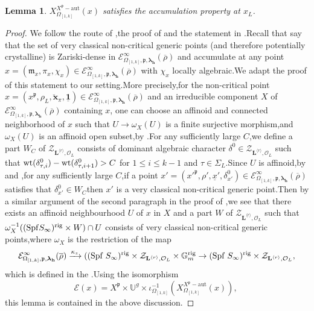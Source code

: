 \documentclass[SecEq,CM,GP]{degruyter-crelle} %
\theoremstyle{plain}
\newtheorem{lem}[thm]{Lemma}
\newcommand{\bersteineigenvarpik}{{\mathcal{E}_{\omepik,\fp,\bm{\lambda}_\bh}^\infty(\overline{\rho})}}
\newcommand{\lrr}{{\langle r\rangle}}
\newcommand{\omepik}{\Omega_{[1,k]}}
\newcommand{\rig}{{\rm rig}}
\newcommand{\rigch}{{\mathcal{Z}_{\bL^{\lrr},\mathcal{O}_L}}}
\newcommand{\Spf}{{\mathrm{Spf}}}
\newcommand{\spf}{{\mathrm{Spf}}}
\newcommand{\wt}{{\rm wt}}
\newcommand{\xfpx}{X^{X^\fp-\mathrm{aut}}_{\omepik}(x)}
\newcommand{\BG}{{\mathbb{G}}}
\newcommand{\BU}{{\mathbb{U}}}
\newcommand{\bL}{{\mathbf{L}}}
\newcommand{\bh}{{\mathbf{h}}}
\newcommand{\cE}{\mathcal E}
\newcommand{\fm}{{\mathfrak{m}}}
\newcommand{\fp}{{\mathfrak{p}}}
\begin{document}
\begin{lem}\label{accumulation} $\xfpx$ satisfies the accumulation property at $x_L$.
\end{lem}
\begin{proof}We follow the route of \cite[Proposition 3.10]{breuil2017smoothness},\;the proof of \cite[Theorem 3.9]{breuil2017interpretation} and the statement in \cite[Theorem 3.3.5]{Ding2021}.\;Recall that \cite[Theorem 3.3.5]{Ding2021} say that the set of very classical non-critical generic points (and therefore potentially crystalline) is Zariski-dense in $\bersteineigenvarpik$ and accumulate at any point $x=(\fm_x, \pi_{x},\chi_x)\in \bersteineigenvarpik$  with $\chi_x$ locally algebraic.\;We adapt the proof of this statement to our setting.\;More precisely,\;for the non-critical point $x=(x^{\fp}, \rho_L, \breve{\mathbf{{x}}}_\pi,\underline{\mathbf{1}})\in \bersteineigenvarpik $
and an irreducible component $X$ of $\bersteineigenvarpik $ containing $x$,\;
one can choose an affinoid and connected neighborhood of $x$ such that $U\rightarrow \omega_X(U)$ is a finite surjective morphism,\;and $\omega_X(U)$ is an affinoid open subset,\;by \cite[Proposition 3.3.2 (2)]{Ding2021}.\;For any sufficiently large $C$,\;we define a part $W_C$ of 
$\rigch$ consists of dominant algebraic character $\delta^0\in \rigch$ such that $\wt(\delta_{\tau,i}^0)-\wt(\delta_{\tau,i+1}^0)>C$ for $1\leq i\leq k-1$ and $\tau\in \Sigma_L$.\;Since $U$ is affinoid,\;by \cite[Proposition 3.2.14]{Ding2021} and \cite[Proposition 3.2.9 and (3.17)]{Ding2021},\;for any sufficiently large $C$,\;if a point $x'=(x'^\fp,\rho',\underline{x}',\delta^0_{x'})\in \bersteineigenvarpik$ satisfies that $\delta^0_{x'}\in W_C$\;then $x'$ is a very classical non-critical generic point.\;Then by a similar  argument of the second paragraph in the proof of \cite[Theorem 3.9]{breuil2017interpretation},\;we see that there exists an affinoid neighbourhood $U$ of $x$ in $X$ and a part $W$ of $\rigch$ such that $\omega_X^{-1}((\spf S_\infty)^\rig\times W)\cap U$ consists of very classical non-critical generic points,\;where $\omega_X$ is the restriction of the map \[\bersteineigenvarpik\xrightarrow{\kappa_z}((\Spf\;S_\infty)^\rig\times \rigch\times \BG_m^{\rig}\rightarrow (\Spf\;S_\infty)^\rig\times \rigch,\]which is defined in the \cite[discussion before Proposition 3.3.2]{Ding2021}.\;Using the isomorphism \[\cE(x)=X^{\fp} \times \BU^g \times \iota_{\omepik}^{-1}(\xfpx),\;\]this lemma is contained in the above discussion.\;
\end{proof}
\end{document}
